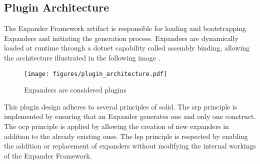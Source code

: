 \subsection{Plugin Architecture} \label{subsec_plugin_architecture}

The Expander Framework artifact is responsible for loading and bootstrapping Expanders and
initiating the generation process. Expanders are dynamically loaded at runtime through a
dotnet capability called assembly binding, allowing the architecture illustrated in the
following image \parencite{koks_expanderpluginloaderinteractor_2023}.

\begin{figure}[htbp]
  \centering
  \texttt{[image: figures/plugin\_architecture.pdf]}
  \caption[Plugin Archticture]{Expanders are considered plugins}
  \label{fi:plugin_architecture}
\end{figure}

This plugin design adheres to several principles of \gls{solid}. The \gls{srp} principle
is implemented by ensuring that an Expander generates one and only one construct. The
\gls{ocp} principle is applied by allowing the creation of new expanders in addition to
the already existing ones. The \gls{lsp} principle is respected by enabling the addition
or replacement of expanders without modifying the internal workings of the Expander
Framework.